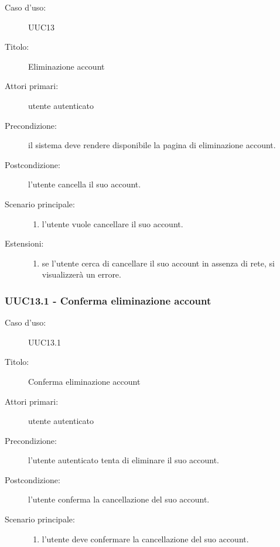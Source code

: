 \documentclass[casi-duso]{subfiles}
\begin{document}
\begin{description}
  \item[Caso d’uso:] UUC13
  \item[Titolo:] Eliminazione account
  \item[Attori primari:] utente autenticato
  \item[Precondizione:] il sistema deve rendere disponibile la pagina di eliminazione account.
  \item[Postcondizione:] l'utente cancella il suo account.
  \item[Scenario principale:]
        \begin{enumerate}
          \item l'utente vuole cancellare il suo account.
        \end{enumerate}
        \item[Estensioni:]
        \begin{enumerate}
          \item se l'utente cerca di cancellare il suo account in assenza di rete, si visualizzerà un errore.
        \end{enumerate}
\end{description}

\subsubsection{UUC13.1 - Conferma eliminazione account}%
\label{subsub:UUC13.1utente}

\begin{description}
  \item[Caso d’uso:] UUC13.1
  \item[Titolo:] Conferma eliminazione account
  \item[Attori primari:] utente autenticato
  \item[Precondizione:] l'utente autenticato tenta di eliminare il suo account.
  \item[Postcondizione:] l'utente conferma la cancellazione del suo account.
  \item[Scenario principale:]
        \begin{enumerate}
          \item l'utente deve confermare la cancellazione del suo account.
        \end{enumerate}
\end{description}
\end{document}
